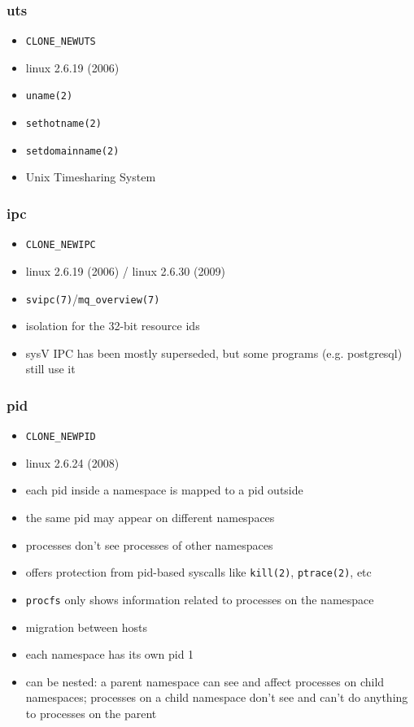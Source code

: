 \documentclass{beamer}
\begin{document}
\begin{frame}
    \frametitle{uts}
    \begin{itemize}
        \item \texttt{CLONE\_NEWUTS}
        \item linux 2.6.19 (2006)
        \item \texttt{uname(2)}
        \item \texttt{sethotname(2)}
        \item \texttt{setdomainname(2)}
        \item Unix Timesharing System
    \end{itemize}
\end{frame}

\begin{frame}
    \frametitle{ipc}
    \begin{itemize}
        \item \texttt{CLONE\_NEWIPC}
        \item linux 2.6.19 (2006) / linux 2.6.30 (2009)
        \item \texttt{svipc(7)}/\texttt{mq\_overview(7)}
        \item isolation for the 32-bit resource ids
        \item
            sysV IPC has been mostly superseded, but some programs (e.g.
            postgresql) still use it
    \end{itemize}
\end{frame}

\begin{frame}
    \frametitle{pid}
    \begin{itemize}
        \item \texttt{CLONE\_NEWPID}
        \item linux 2.6.24 (2008)
        \item each pid inside a namespace is mapped to a pid outside
        \item the same pid may appear on different namespaces
        \item processes don't see processes of other namespaces
        \item
            offers protection from pid-based syscalls like \texttt{kill(2)},
            \texttt{ptrace(2)}, etc
        \item
            \texttt{procfs} only shows information related to processes on the
            namespace
        \item migration between hosts
        \item each namespace has its own pid 1
        \item
            can be nested: a parent namespace can see and affect processes on
            child namespaces; processes on a child namespace don't see and
            can't do anything to processes on the parent
    \end{itemize}
\end{frame}
\end{document}
